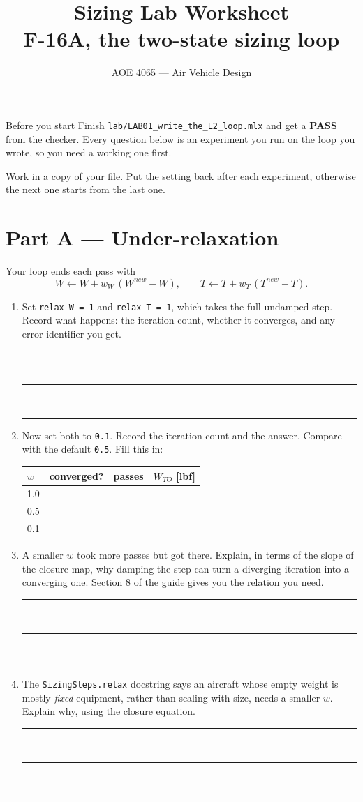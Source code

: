 \documentclass[11pt, a4paper]{article}
\title{\vspace{-14mm}\textbf{Sizing Lab Worksheet}\\[2mm]
  \large F-16A, the two-state sizing loop}
\author{AOE 4065 --- Air Vehicle Design}
\date{}
\newcommand{\answerspace}[1]{\vspace{#1}\noindent\rule{\linewidth}{0.3pt}\\[2mm]
  \noindent\rule{\linewidth}{0.3pt}\\[2mm]\noindent\rule{\linewidth}{0.3pt}\vspace{3mm}}
\begin{document}
\maketitle
\vspace{-6mm}

\begin{keybox}{Before you start}
Finish \texttt{lab/LAB01\_write\_the\_L2\_loop.mlx} and get a \textbf{PASS}
from the checker. Every question below is an experiment you run on the loop
you wrote, so you need a working one first.

Work in a copy of your file. Put the setting back after each experiment,
otherwise the next one starts from the last one.
\end{keybox}

\section*{Part A --- Under-relaxation}

Your loop ends each pass with
\[
W \leftarrow W + w_W\,(W^{new} - W), \qquad
T \leftarrow T + w_T\,(T^{new} - T).
\]

\begin{enumerate}[leftmargin=*, itemsep=3mm]

\item Set \texttt{relax\_W = 1} and \texttt{relax\_T = 1}, which takes the full
undamped step. Record what happens: the iteration count, whether it converges,
and any error identifier you get.
\answerspace{4mm}

\item Now set both to \texttt{0.1}. Record the iteration count and the answer.
Compare with the default \texttt{0.5}. Fill this in:

\begin{center}
\begin{tabular}{@{}lccc@{}}
\toprule
$w$ & converged? & passes & $W_{TO}$ [lbf] \\
\midrule
1.0  & & & \\[2mm]
0.5  & & & \\[2mm]
0.1  & & & \\
\bottomrule
\end{tabular}
\end{center}

\item A smaller $w$ took more passes but got there. Explain, in terms of the
slope of the closure map, why damping the step can turn a diverging iteration
into a converging one. Section 8 of the guide gives you the relation you need.
\answerspace{12mm}

\item The \texttt{SizingSteps.relax} docstring says an aircraft whose empty
weight is mostly \emph{fixed} equipment, rather than scaling with size, needs a
smaller $w$. Explain why, using the closure equation.
\answerspace{12mm}

\end{enumerate}
\end{document}
